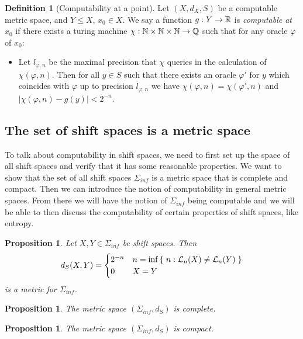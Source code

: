 \documentclass[11pt, reqno]{amsart}
\theoremstyle{plain}
\numberwithin{thm}{subsection}
\newtheorem{prop}[thm]{Proposition}
\theoremstyle{definition}
\newtheorem{defn}[thm]{Definition}
\begin{document}
\begin{defn}[Computability at a point]
   Let $(X, d_X, S)$ be a computable metric space, and $Y \leq X$, $x_0 \in X$. We say a function $g: Y \rightarrow \mathbb{R}$ is \textit{computable at $x_0$} if there exists a turing machine $\chi: \mathbb{N} \times \mathbb{N} \times \mathbb{N} \rightarrow \mathbb{Q}$ such that for any oracle $\varphi$ of $x_0$:
   \begin{itemize}
    \item[ ] Let $l_{\varphi, n}$ be the maximal precision that $\chi$ queries in the calculation of $\chi(\varphi, n)$. Then for all $y\in S$ such that there exists an oracle $\varphi'$ for $y$ which coincides with $\varphi$ up to precision $l_{\varphi, n}$ we have $\chi(\varphi, n) = \chi(\varphi', n)$ and $|\chi(\varphi, n) - g(y)| < 2^{-n}$.
   \end{itemize}
\end{defn}

\subsection{The set of shift spaces is a metric space}

To talk about computability in shift spaces, we need to first set up the space of all shift spaces and verify that it has some reasonable properties. We want to show that the set of all shift spaces $\Sigma_{inf}$ is a metric space that is complete and compact. Then we can  introduce the notion of computability in general metric spaces. From there we will have the notion of $\Sigma_{inf}$ being computable and we will be able to then discuss the computability of certain properties of shift spaces, like entropy.

\begin{prop}
  Let $X, Y \in \Sigma_{inf}$ be shift spaces. Then
  $$d_S(X,Y) = \begin{cases}
    2^{-n} & n = \inf \,\{\;n : \mathcal{L}_n(X)\neq \mathcal{L}_n(Y)\;\} \\
    0 & X = Y \\  
  \end{cases}$$
  is a metric for $\Sigma_{inf}$. 
\end{prop}

\begin{prop}
  The metric space $(\Sigma_{inf}, d_S)$ is complete.
\end{prop}

\begin{prop}
  The metric space $(\Sigma_{inf}, d_S)$ is compact.
\end{prop}
\end{document}
